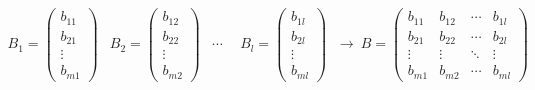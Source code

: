 \begin{equation*}
\begin{aligned}
B_1=\begin{pmatrix}
b_{11}\\ b_{21}\\ \vdots \\ b_{m1}
\end{pmatrix}&
B_2=\begin{pmatrix}
b_{12}\\ b_{22}\\ \vdots\\ b_{m2}
\end{pmatrix} &
\cdots  \  \  &
B_l=\begin{pmatrix}
b_{1l}\\ b_{2l}\\ \vdots \\ b_{ml}
\end{pmatrix}
\end{aligned} \ \rightarrow \ 
B=\begin{pmatrix}
b_{11}& b_{12}& \cdots& b_{1l}\\
b_{21}& b_{22}& \cdots& b_{2l}\\
\vdots& \vdots& \ddots& \vdots \\
b_{m1}& b_{m2}& \cdots& b_{ml}
\end{pmatrix}
\end{equation*}

